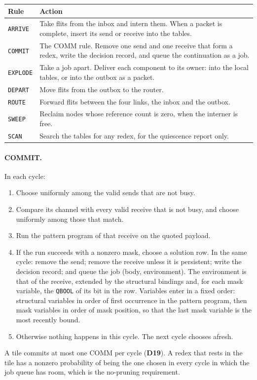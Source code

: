 \documentclass[10.5pt,a4paper]{extarticle}
\newcommand{\kw}[1]{\texttt{#1}}
\newcommand{\dec}[1]{\textbf{D#1}}
\theoremstyle{definition}
\theoremstyle{remark}
\begin{document}
\medskip\noindent
\begin{tabularx}{\textwidth}{@{}l X@{}}
\toprule
Rule & Action\\
\midrule
\kw{ARRIVE} & Take flits from the inbox and intern them. When a packet is
  complete, insert its send or receive into the tables.\\
\kw{COMMIT} & The COMM rule. Remove one send and one receive that form a
  redex, write the decision record, and queue the continuation as a job.\\
\kw{EXPLODE} & Take a job apart. Deliver each component to its owner: into
  the local tables, or into the outbox as a packet.\\
\kw{DEPART} & Move flits from the outbox to the router.\\
\kw{ROUTE} & Forward flits between the four links, the inbox and the outbox.\\
\kw{SWEEP} & Reclaim nodes whose reference count is zero, when the interner
  is free.\\
\kw{SCAN} & Search the tables for any redex, for the quiescence report only.\\
\bottomrule
\end{tabularx}

\paragraph{COMMIT.} In each cycle:
\begin{enumerate}
\item Choose uniformly among the valid sends that are not busy.
\item Compare its channel with every valid receive that is not busy, and
choose uniformly among those that match.
\item Run the pattern program of that receive on the quoted payload.
\item If the run succeeds with a nonzero mask, choose a solution row. In the
same cycle: remove the send; remove the receive unless it is persistent;
write the decision record; and queue the job (body, environment). The
environment is that of the receive, extended by the structural bindings and,
for each mask variable, the \kw{QBOOL} of its bit in the row. Variables enter
in a fixed order: structural variables in order of first occurrence in the
pattern program, then mask variables in order of mask position, so that the
last mask variable is the most recently bound.
\item Otherwise nothing happens in this cycle. The next cycle chooses afresh.
\end{enumerate}
A tile commits at most one COMM per cycle (\dec{19}). A redex that rests in
the tile has a nonzero probability of being the one chosen in every cycle in
which the job queue has room, which is the no-pruning requirement.
\end{document}
